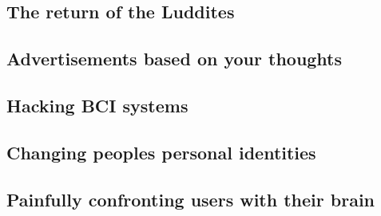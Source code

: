 \subsection{The return of the Luddites}
\label{subsec:bci_ethical_luddites}

\lipsum[1-3]


\subsection{Advertisements based on your thoughts}
\label{subsec:bci_ethical_data_mining}

\lipsum[1-2]


\subsection{Hacking BCI systems}
\label{subsec:bci_ethical_hacking}

\lipsum[1-2]


\subsection{Changing peoples personal identities}
\label{subsec:bci_ethical_identity}

\lipsum[1-3]


\subsection{Painfully confronting users with their brain}
\label{subsec:bci_ethical_confronting}

\lipsum[1-4]


